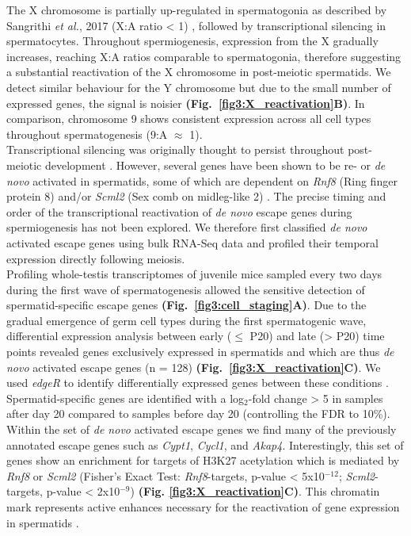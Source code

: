 The X chromosome is partially up-regulated in spermatogonia as described by Sangrithi \emph{et al.}, 2017 (X:A ratio < 1) \citep{Sangrithi2017}, followed by transcriptional silencing in spermatocytes. Throughout spermiogenesis, expression from the X gradually increases, reaching X:A ratios comparable to spermatogonia, therefore suggesting a substantial reactivation of the X chromosome in post-meiotic spermatids. We detect similar behaviour for the Y chromosome but due to the small number of expressed genes, the signal is noisier \textbf{(Fig.~\ref{fig3:X_reactivation}B)}. In comparison, chromosome 9 shows consistent expression across all cell types throughout spermatogenesis (9:A $\approx$ 1).\\

Transcriptional silencing was originally thought to persist throughout post-meiotic development \citep{Greaves2006, Turner2006}. However, several genes have been shown to be re- or \emph{de novo} activated in spermatids, some of which are dependent on \textit{Rnf8} (Ring finger protein 8) and/or \textit{Scml2} (Sex comb on midleg-like 2) \citep{Hasegawa2015, Sin2012, Sin2015}. The precise timing and order of the transcriptional reactivation of \emph{de novo} escape genes during spermiogenesis has not been explored. We therefore first classified \emph{de novo} activated escape genes using bulk RNA-Seq data and profiled their temporal expression directly following meiosis.\\

Profiling whole-testis transcriptomes of juvenile mice sampled every two days during the first wave of spermatogenesis allowed the sensitive detection of spermatid-specific escape genes \textbf{(Fig.~\ref{fig3:cell_staging}A)}. Due to the gradual emergence of germ cell types during the first spermatogenic wave, differential expression analysis between early ($\leq$ P20) and late (> P20) time points revealed genes exclusively expressed in spermatids and which are thus \emph{de novo} activated escape genes (n = 128) \textbf{(Fig.~\ref{fig3:X_reactivation}C)}. We used \emph{edgeR} to identify differentially expressed genes between these conditions \citep{Robinson2009}. Spermatid-specific genes are identified with a log$_2$-fold change > 5 in samples after day 20 compared to samples before day 20 (controlling the FDR to 10\%). \\

Within the set of \emph{de novo} activated escape genes we find many of the previously annotated escape genes such as \textit{Cypt1}, \textit{Cycl1}, and \textit{Akap4}. Interestingly, this set of genes show an enrichment for targets of H3K27 acetylation which is mediated by \textit{Rnf8} or \textit{Scml2} (Fisher's Exact Test: \textit{Rnf8}-targets, p-value < 5x10$^{-12}$; \textit{Scml2}-targets, p-value < 2x10$^{-9}$) \textbf{(Fig. \ref{fig3:X_reactivation}C)}. This chromatin mark represents active enhances necessary for the reactivation of gene expression in spermatids \citep{Adams2018}. \\

